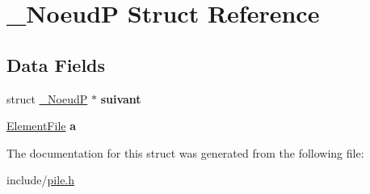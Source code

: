 \hypertarget{struct___noeud_p}{\section{\-\_\-\-Noeud\-P Struct Reference}
\label{struct___noeud_p}
}
\subsection*{Data Fields}
\begin{DoxyCompactItemize}
\item 
\hypertarget{struct___noeud_p_a1eed773323aa23a2d52ebc5f2d4a412d}{struct \hyperlink{struct___noeud_p}{\-\_\-\-Noeud\-P} $\ast$ {\bfseries suivant}}\label{struct___noeud_p_a1eed773323aa23a2d52ebc5f2d4a412d}

\item 
\hypertarget{struct___noeud_p_ab72f810bc5b71735f5ae01e5c85cf615}{\hyperlink{struct___element_file}{Element\-File} {\bfseries a}}\label{struct___noeud_p_ab72f810bc5b71735f5ae01e5c85cf615}

\end{DoxyCompactItemize}


The documentation for this struct was generated from the following file\-:\begin{DoxyCompactItemize}
\item 
include/\hyperlink{pile_8h}{pile.\-h}\end{DoxyCompactItemize}
